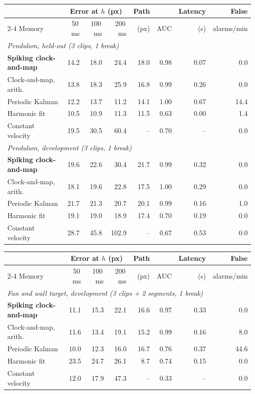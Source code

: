 \begin{tabular}{lrrrrrrr}
\toprule
 & \multicolumn{3}{c}{Error at $h$ (px)} & Path & & Latency & False \\
\cmidrule(lr){2-4}
Memory & 50\,ms & 100\,ms & 200\,ms & (px) & AUC & (s) & alarms/min \\
\midrule
\multicolumn{8}{l}{\emph{Pendulum, held-out (3 clips, 1 break)}} \\
\textbf{Spiking clock-and-map} & 14.2 & 18.0 & 24.4 & 18.0 & 0.98 & 0.07 & 0.0 \\
Clock-and-map, arith. & 13.8 & 18.3 & 25.9 & 16.8 & 0.99 & 0.26 & 0.0 \\
Periodic Kalman & 12.2 & 13.7 & 11.2 & 14.1 & 1.00 & 0.67 & 14.4 \\
Harmonic fit & 10.5 & 10.9 & 11.3 & 11.5 & 0.63 & 0.00 & 1.4 \\
Constant velocity & 19.5 & 30.5 & 60.4 & -- & 0.70 & -- & 0.0 \\
\midrule
\multicolumn{8}{l}{\emph{Pendulum, development (3 clips, 1 break)}} \\
\textbf{Spiking clock-and-map} & 19.6 & 22.6 & 30.4 & 21.7 & 0.99 & 0.32 & 0.0 \\
Clock-and-map, arith. & 18.1 & 19.6 & 22.8 & 17.5 & 1.00 & 0.29 & 0.0 \\
Periodic Kalman & 21.7 & 21.3 & 20.7 & 20.1 & 0.99 & 0.16 & 1.0 \\
Harmonic fit & 19.1 & 19.0 & 18.9 & 17.4 & 0.70 & 0.19 & 0.0 \\
Constant velocity & 28.7 & 45.8 & 102.9 & -- & 0.67 & 0.53 & 0.0 \\
\bottomrule
\end{tabular}

\begin{tabular}{lrrrrrrr}
\toprule
 & \multicolumn{3}{c}{Error at $h$ (px)} & Path & & Latency & False \\
\cmidrule(lr){2-4}
Memory & 50\,ms & 100\,ms & 200\,ms & (px) & AUC & (s) & alarms/min \\
\midrule
\multicolumn{8}{l}{\emph{Fan and wall target, development (3 clips + 2 segments, 1 break)}} \\
\textbf{Spiking clock-and-map} & 11.1 & 15.3 & 22.1 & 16.6 & 0.97 & 0.33 & 0.0 \\
Clock-and-map, arith. & 11.6 & 13.4 & 19.1 & 15.2 & 0.99 & 0.16 & 8.0 \\
Periodic Kalman & 10.0 & 12.3 & 16.0 & 16.7 & 0.76 & 0.37 & 44.6 \\
Harmonic fit & 23.5 & 24.7 & 26.1 & 8.7 & 0.74 & 0.15 & 0.0 \\
Constant velocity & 12.0 & 17.9 & 47.3 & -- & 0.33 & -- & 0.0 \\
\bottomrule
\end{tabular}
